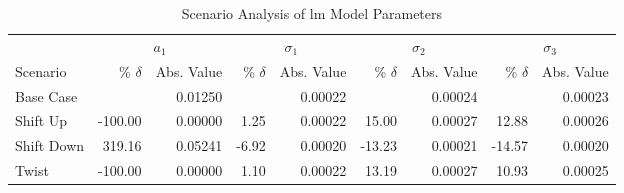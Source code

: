 \begin{table}[H]
	\centering
	\setlength{\tabcolsep}{5pt}
	\caption{Scenario Analysis of \ac{lm} Model Parameters}
	\label{tab:scenario_analysis_part_lm}
	\begin{threeparttable}
		\begin{tabular}{l *{4}{rr}}
			\toprule
			           & \multicolumn{2}{c}{$a_1$} & \multicolumn{2}{c}{$\sigma_1$} & \multicolumn{2}{c}{$\sigma_2$} & \multicolumn{2}{c}{$\sigma_3$}                                                       \\
			\cmidrule(lr){2-3} \cmidrule(lr){4-5} \cmidrule(lr){6-7} \cmidrule(lr){8-9}
			Scenario   & \% $\delta$               & Abs. Value                     & \% $\delta$                    & Abs. Value                     & \% $\delta$ & Abs. Value & \% $\delta$ & Abs. Value \\
			\midrule

			Base Case  &                           & 0.01250                        &                                & 0.00022                        &             & 0.00024    &             & 0.00023    \\
			Shift Up   & -100.00                   & 0.00000                        & 1.25                           & 0.00022                        & 15.00       & 0.00027    & 12.88       & 0.00026    \\
			Shift Down & 319.16                    & 0.05241                        & -6.92                          & 0.00020                        & -13.23      & 0.00021    & -14.57      & 0.00020    \\
			Twist      & -100.00                   & 0.00000                        & 1.10                           & 0.00022                        & 13.19       & 0.00027    & 10.93       & 0.00025    \\
			\bottomrule
		\end{tabular}
	\end{threeparttable}
\end{table}

